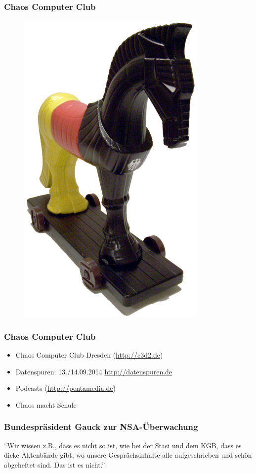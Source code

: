\documentclass[12pt]{beamer}
\begin{document}
\begin{frame}
  \frametitle{Chaos Computer Club}
  \begin{figure}
    \includegraphics[height=0.7\textheight]{img/trojaner.png}
  \end{figure}
\end{frame}

\begin{frame}
    \frametitle{Chaos Computer Club}
    \begin{itemize}
      \item<1-> Chaos Computer Club Dresden (\url{http://c3d2.de})
          \note{}
      \item<2-> Datenspuren: 13./14.09.2014 \url{http://datenspuren.de}
      \item<3-> Podcasts (\url{http://pentamedia.de})
      \item<4-> Chaos macht Schule
    \end{itemize}
\end{frame}

\begin{frame}
    \frametitle{Bundespräsident Gauck zur NSA-Überwachung}
    \begin{center}
      ``Wir wissen z.B., dass es nicht so ist, wie bei der Stasi und dem KGB, dass es dicke Aktenbände gibt, wo unsere Gesprächsinhalte alle aufgeschrieben und schön abgeheftet sind. Das ist es nicht.''
      \end{center}
\end{frame}
\end{document}

